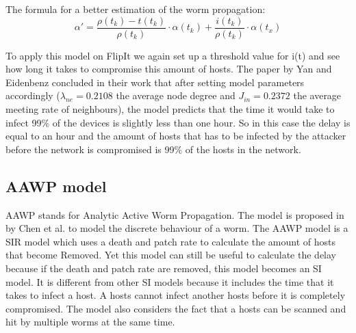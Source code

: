 The formula for a better estimation of the worm propagation:
\begin{equation}
\alpha'=\dfrac{\rho(t_{k})-t(t_{k})}{\rho(t_{k})} \cdot \alpha(t_{k}) + \dfrac{i(t_{k})}{\rho(t_{k})} \cdot \alpha(t_{x})
\end{equation}


To apply this model on FlipIt we again set up a threshold value for i(t) and see how long it takes to compromise this amount of hosts.  The paper by Yan and Eidenbenz concluded in their work  that after setting model parameters accordingly ($\lambda_{ne} = 0.2108$ the average node degree and $J_{in}= 0.2372$ the average meeting rate of neighbours), the model predicts that the time it would take to infect 99$\%$ of the devices is slightly less than one hour. So in this case the delay is equal to an hour and the amount of hosts that has to be infected by the attacker before the network is compromised is 99$\%$ of the hosts in the network.



\subsection{AAWP model}
AAWP stands for Analytic Active Worm Propagation. The model is proposed in \cite{chen2003modeling} by Chen et al. to model the discrete behaviour of a worm. The AAWP model is a SIR model which uses a death and patch rate to calculate the amount of hosts that become Removed. Yet this model can still be useful to calculate the delay because if the death and patch rate are removed, this model becomes an SI model. It is different from other SI models because it includes the time that it takes to infect a host. A hosts cannot infect another hosts before it is completely compromised. The model also considers the fact that a hosts can be scanned and hit by multiple worms at the same time. \\%

